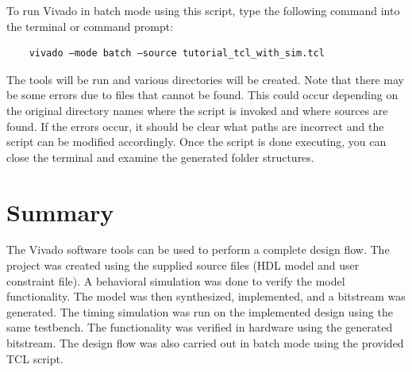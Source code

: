 \documentclass[11pt]{article}
\begin{document}
To run Vivado in batch mode using this script, type the following command into the terminal or command prompt:

\begin{verbatim}
    vivado –mode batch –source tutorial_tcl_with_sim.tcl
\end{verbatim}

\noindent
The tools will be run and various directories will be created. Note that there may be some errors due to files that cannot be found. This could occur depending on the original directory names where the script is invoked and where sources are found. If the errors occur, it should be clear what paths are incorrect and the script can be modified accordingly. Once the script is done executing, you can close the terminal and examine the generated folder structures.




\section{Summary}
\label{sec:summary}
The Vivado software tools can be used to perform a complete design flow. The project was created using the supplied source files (HDL model and user constraint file). A behavioral simulation was done to verify the model functionality. The model was then synthesized, implemented, and a bitstream was generated. The timing simulation was run on the implemented design using the same testbench. The functionality was verified in hardware using the generated bitstream. The design flow was also carried out in batch mode using the provided TCL script.




\end{document}
